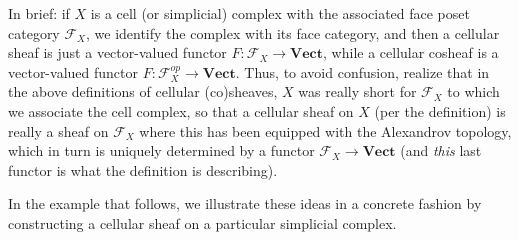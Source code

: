 \documentclass[11pt]{book}
\theoremstyle{definition}
\theoremstyle{definition}
\theoremstyle{definition}
\theoremstyle{theorem}
\theoremstyle{definition}
\begin{document}
	In brief: if $X$ is a cell (or simplicial) complex with the associated face poset category $\mathcal{F}_X$, we identify the complex with its face category, and then a cellular sheaf is just a vector-valued functor $F: \mathcal{F}_X \rightarrow \textbf{Vect}$, while a cellular cosheaf is a vector-valued functor $F: \mathcal{F}_X^{op} \rightarrow \textbf{Vect}$. Thus, to avoid confusion, realize that in the above definitions of cellular (co)sheaves, $X$ was really short for $\mathcal{F}_X$ to which we associate the cell complex, so that a cellular sheaf on $X$ (per the definition) is really a sheaf on $\mathcal{F}_X$ where this has been equipped with the Alexandrov topology, which in turn is uniquely determined by a functor $\mathcal{F}_X \rightarrow \textbf{Vect}$ (and \textit{this} last functor is what the definition is describing). \par  
 	In the example that follows, we illustrate these ideas in a concrete fashion by constructing a cellular sheaf on a particular simplicial complex. 
\end{document}
